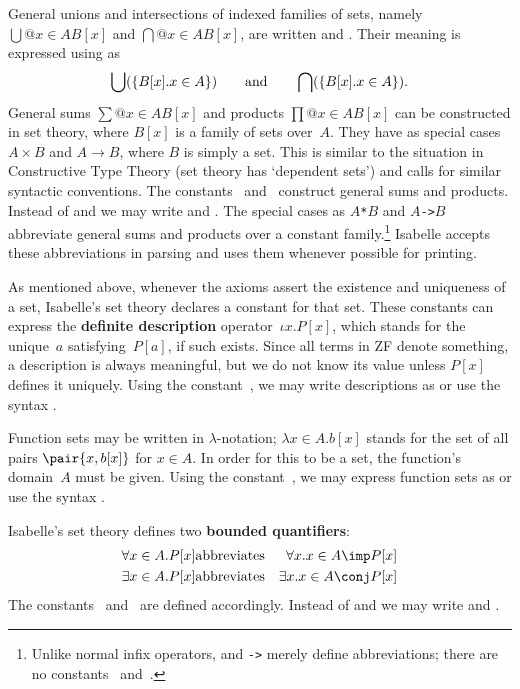 General unions and intersections of indexed
families of sets, namely $\bigcup@{x\in A}B[x]$ and $\bigcap@{x\in A}B[x]$,
are written  and .
Their meaning is expressed using  as
\[
\bigcup(\{B[x]. x\in A\}) \qquad\hbox{and}\qquad 
\bigcap(\{B[x]. x\in A\}). 
\]
General sums $\sum@{x\in A}B[x]$ and products $\prod@{x\in A}B[x]$ can be
constructed in set theory, where $B[x]$ is a family of sets over~$A$.  They
have as special cases $A\times B$ and $A\to B$, where $B$ is simply a set.
This is similar to the situation in Constructive Type Theory (set theory
has `dependent sets') and calls for similar syntactic conventions.  The
constants~ and~ construct general sums and
products.  Instead of  and  we may
write 
 and .  
%
The special cases as \hbox{\tt$A$*$B$} and \hbox{\tt$A$->$B$} abbreviate
general sums and products over a constant family.\footnote{Unlike normal
infix operators, {\tt*} and {\tt->} merely define abbreviations; there are
no constants~ and~.} Isabelle accepts these
abbreviations in parsing and uses them whenever possible for printing.

 As mentioned above, whenever the axioms assert the
existence and uniqueness of a set, Isabelle's set theory declares a constant
for that set.  These constants can express the {\bf definite description}
operator~$\iota x. P[x]$, which stands for the unique~$a$ satisfying~$P[a]$,
if such exists.  Since all terms in ZF denote something, a description is
always meaningful, but we do not know its value unless $P[x]$ defines it
uniquely.  Using the constant~, we may write descriptions as 
 or use the syntax .

Function sets may be written in $\lambda$-notation; $\lambda x\in A. b[x]$
stands for the set of all pairs $\pair{x,b[x]}$ for $x\in A$.  In order for
this to be a set, the function's domain~$A$ must be given.  Using the
constant~, we may express function sets as  or use the syntax .

Isabelle's set theory defines two {\bf bounded quantifiers}:
\begin{eqnarray*}
   \forall x\in A. P[x] &\hbox{abbreviates}& \forall x. x\in A\imp P[x] \\
   \exists x\in A. P[x] &\hbox{abbreviates}& \exists x. x\in A\conj P[x]
\end{eqnarray*}
The constants~ and~ are defined
accordingly.  Instead of  and  we may
write
 and .


